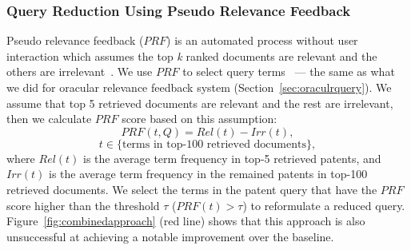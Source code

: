 \subsubsection{Query Reduction Using Pseudo Relevance Feedback}
Pseudo relevance feedback ($\mathit{PRF}$) is an automated process without user interaction which assumes the top \textit{k} ranked documents are relevant and the others are irrelevant~\citep{Baeza-Yates2011}. We use $\mathit{PRF}$ to select query terms~\cite{maxwell2013compact} --- the same as what we did for oracular relevance feedback system (Section~\ref{sec:oraculrquery}). We assume that top 5 retrieved documents are relevant and the rest are irrelevant, then we calculate $\mathit{PRF}$ score based on this assumption:  
\begin{equation}
PRF(t,Q)=Rel(t)-Irr(t), 
 \label{eq:score}
\end{equation}
\vspace*{-2ex}
\begin{displaymath}t\in \lbrace \mbox{terms in top-100 retrieved documents}\rbrace,\end{displaymath}
where $\mathit{Rel(t)}$ is the average term frequency in top-5 retrieved patents, and $\mathit{Irr(t)}$ is
the average term frequency in the remained patents in top-100 retrieved documents.
We select the terms in the patent query that have the $\mathit{PRF}$ score higher than the threshold $\tau$ ($PRF(t)>\tau$) to reformulate a reduced query. Figure~\ref{fig:combinedapproach} (red line) shows that this approach is also unsuccessful at achieving a notable improvement over the baseline.
